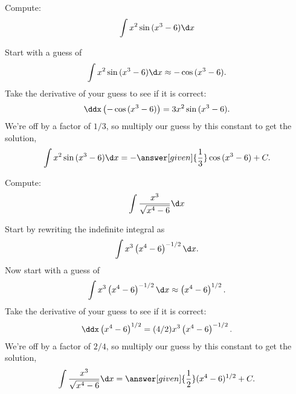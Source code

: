\documentclass{ximera}
\begin{document}
\begin{example}
  Compute:
  \[
  \int x^2\sin{(x^3 -6)} \d x
  \]
  \begin{explanation}
    Start with a guess of 
    \[
 \int x^2\sin{(x^3 -6)} \d x \approx -\cos{(x^3 -6)}.
    \]
    Take the derivative of your guess to see if it is correct:
    \[
    \ddx \left(-\cos{(x^3 -6)}\right) = 3x^2\sin{(x^3 -6)}.
    \]
    We're off by a factor of $1/3$, so multiply our guess by this constant
    to get the solution,
    \[
    \int x^2\sin{(x^3 -6)} \d x
 =- \answer[given]{\frac{1}{3}}\cos{(x^3 -6)}+C.
    \]
\end{explanation}
\end{example}

\begin{example}
  Compute:
  \[
  \int \frac{x^3}{\sqrt{x^4 -6}} \d x
  \]
  \begin{explanation}
    Start by rewriting the indefinite integral as
    \[
    \int x^3\left(x^4 -6\right)^{-1/2} \d x.
    \]
    Now start with a guess of 
    \[
    \int x^3\left(x^4 -6\right)^{-1/2} \d x \approx \left(x^4 -6\right)^{1/2}.
    \]
    Take the derivative of your guess to see if it is correct:
    \[
    \ddx  \left(x^4 -6\right)^{1/2} = (4/2)x^3\left(x^4 -6\right)^{-1/2}.
    \]
    We're off by a factor of $2/4$, so multiply our guess by this constant
    to get the solution,
    \[
    \int \frac{x^3}{\sqrt{x^4 -6}} \d x = \answer[given]{\frac{1}{2}}(x^4 -6)^{1/2}+C.
    \]
\end{explanation}
\end{example}
\end{document}
